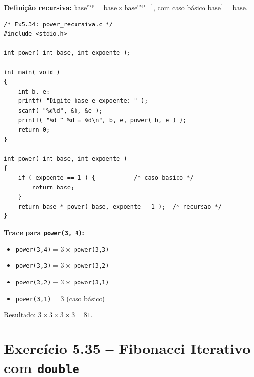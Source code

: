\documentclass[12pt,a4paper]{article}
\begin{document}
\begin{respostabox}
\textbf{Definição recursiva:} $\text{base}^{\text{exp}} = \text{base} \times \text{base}^{\text{exp}-1}$,
com caso básico $\text{base}^1 = \text{base}$.

\begin{lstlisting}
/* Ex5.34: power_recursiva.c */
#include <stdio.h>

int power( int base, int expoente );

int main( void )
{
    int b, e;
    printf( "Digite base e expoente: " );
    scanf( "%d%d", &b, &e );
    printf( "%d ^ %d = %d\n", b, e, power( b, e ) );
    return 0;
}

int power( int base, int expoente )
{
    if ( expoente == 1 ) {           /* caso basico */
        return base;
    }
    return base * power( base, expoente - 1 );  /* recursao */
}
\end{lstlisting}

\textbf{Trace para \texttt{power(3, 4)}:}
\begin{itemize}[noitemsep]
  \item \texttt{power(3,4)} = $3 \times $ \texttt{power(3,3)}
  \item \texttt{power(3,3)} = $3 \times $ \texttt{power(3,2)}
  \item \texttt{power(3,2)} = $3 \times $ \texttt{power(3,1)}
  \item \texttt{power(3,1)} = 3 (caso básico)
\end{itemize}
Resultado: $3 \times 3 \times 3 \times 3 = 81$.
\end{respostabox}

\section{Exercício 5.35 -- Fibonacci Iterativo com \texttt{double}}
\end{document}
